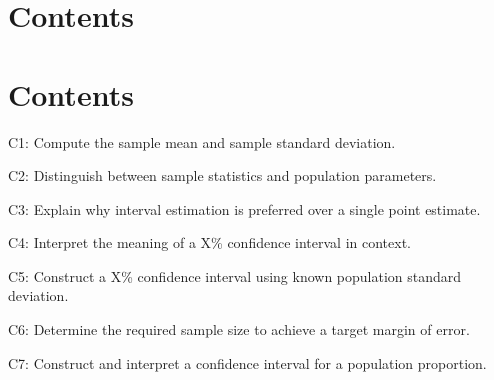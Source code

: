 


\section*{Contents}
\setcounter{tocdepth}{2}
\setcounter{secnumdepth}{1}
\section*{Contents}
\setcounter{tocdepth}{2}
\setcounter{secnumdepth}{1}
\tableofcontents
	\begin{ExamCriteria}
		\item C1: Compute the sample mean and sample standard deviation.
		\item C2: Distinguish between sample statistics and population parameters.
		\item C3: Explain why interval estimation is preferred over a single point estimate.
		\item C4: Interpret the meaning of a X\% confidence interval in context.
		\item C5: Construct a X\% confidence interval using known population standard deviation.
		\item C6: Determine the required sample size to achieve a target margin of error.
		\item C7: Construct and interpret a confidence interval for a population proportion.
	\end{ExamCriteria}

